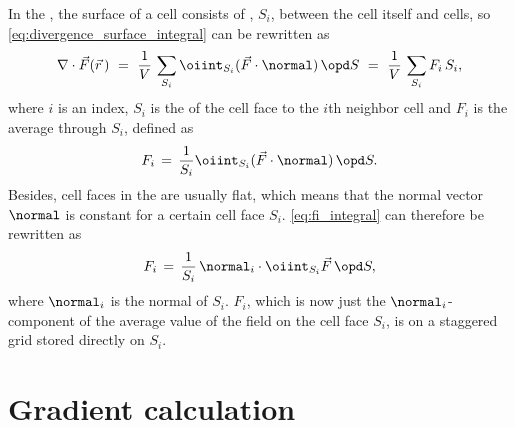 In the \FVM, the surface of a cell consists of , $S_i$, between the cell itself and \neighboring cells, so \eqref{eq:divergence_surface_integral} can be rewritten as
%
\begin{equation} \label{eq:divergence_cell_face_sum}
\nabla\cdot\vec{F}(\vec{r}\,)\ =\ \frac{1}{V}\,\sum_{S_i} \oiint_{S_i}(\vec{F}\cdot\normal)\,\opd S\ =\ \frac{1}{V}\,\sum_{S_i} F_i\,S_i,
\end{equation}
%
where $i$ is an index, $S_i$ is the \area of the cell face to the $i$th neighbor cell and $F_i$ is the average  through $S_i$, defined as
%
\begin{equation} \label{eq:fi_integral}
F_i \,=\, \frac{1}{S_i}\oiint_{S_i}(\vec{F}\cdot\normal)\,\opd S.
\end{equation}
%
Besides, cell faces in the \FVM are usually flat, which means that the normal vector $\normal$ is constant for a certain cell face $S_i$. \eqref{eq:fi_integral} can therefore be rewritten as
%
\begin{equation} \label{eq:fi_flat_cell_face}
F_i \,=\, \frac{1}{S_i}\,\normal_i\cdot\oiint_{S_i}\vec{F}\,\opd S,
\end{equation}
%
where $\normal_i$ is the normal of $S_i$. $F_i$, which is now just the $\normal_i$-component of the average value of the field on the cell face $S_i$, is on a staggered grid stored directly on $S_i$.

\section{Gradient calculation}

